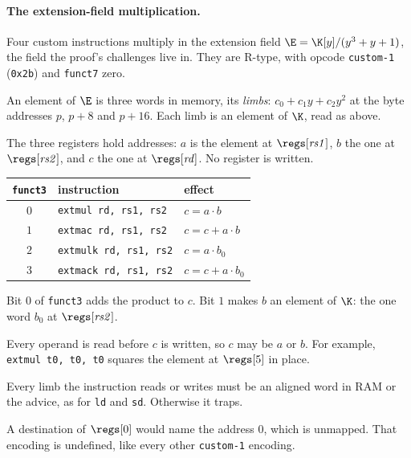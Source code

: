 \paragraph{The extension-field multiplication.} Four custom instructions multiply in the extension field $\E=\K[y]/(y^3+y+1)$, the field the proof's challenges live in. They are R-type, with opcode \texttt{custom-1} (\texttt{0x2b}) and \texttt{funct7} zero.

An element of $\E$ is three words in memory, its \emph{limbs}: $c_0+c_1y+c_2y^2$ at the byte addresses $p$, $p+8$ and $p+16$. Each limb is an element of $\K$, read as above.

The three registers hold addresses: $a$ is the element at $\regs[\mathit{rs1}]$, $b$ the one at $\regs[\mathit{rs2}]$, and $c$ the one at $\regs[\mathit{rd}]$. No register is written.
\begin{center}
\begin{tabular}{@{}cll@{}}
\hline
\texttt{funct3} & instruction & effect\\
\hline
$0$ & \texttt{extmul rd, rs1, rs2}  & $c = a\cdot b$\\
$1$ & \texttt{extmac rd, rs1, rs2}  & $c = c+a\cdot b$\\
$2$ & \texttt{extmulk rd, rs1, rs2} & $c = a\cdot b_0$\\
$3$ & \texttt{extmack rd, rs1, rs2} & $c = c+a\cdot b_0$\\
\hline
\end{tabular}
\end{center}
Bit $0$ of \texttt{funct3} adds the product to $c$. Bit $1$ makes $b$ an element of $\K$: the one word $b_0$ at $\regs[\mathit{rs2}]$.

Every operand is read before $c$ is written, so $c$ may be $a$ or $b$. For example, \texttt{extmul t0, t0, t0} squares the element at $\regs[5]$ in place.

Every limb the instruction reads or writes must be an aligned word in RAM or the advice, as for \texttt{ld} and \texttt{sd}. Otherwise it traps.

A destination of $\regs[0]$ would name the address $0$, which is unmapped. That encoding is undefined, like every other \texttt{custom-1} encoding.
